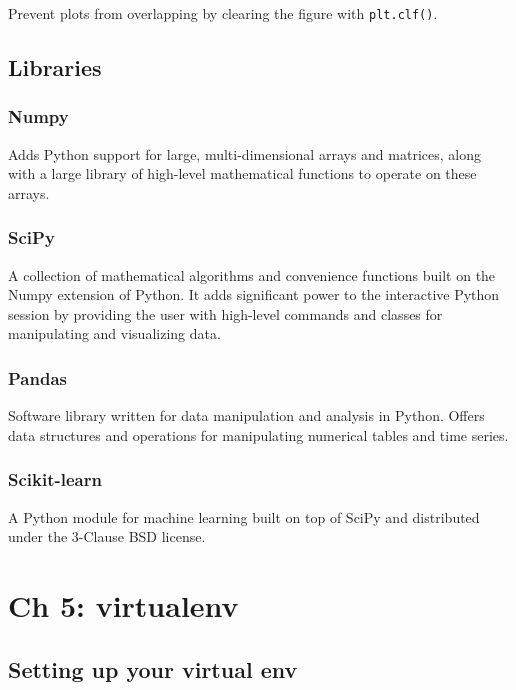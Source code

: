 \documentclass[]{book}
\theoremstyle{definition}
\theoremstyle{definition}
\theoremstyle{definition}
\theoremstyle{remark}
\begin{document}
Prevent plots from overlapping by clearing the figure with
\texttt{plt.clf()}.

\hypertarget{libraries-1}{%
\section{Libraries}\label{libraries-1}}

\hypertarget{numpy}{%
\subsection{Numpy}\label{numpy}}

Adds Python support for large, multi-dimensional arrays and matrices,
along with a large library of high-level mathematical functions to
operate on these arrays.

\hypertarget{scipy}{%
\subsection{SciPy}\label{scipy}}

A collection of mathematical algorithms and convenience functions built
on the Numpy extension of Python. It adds significant power to the
interactive Python session by providing the user with high-level
commands and classes for manipulating and visualizing data.

\hypertarget{pandas}{%
\subsection{Pandas}\label{pandas}}

Software library written for data manipulation and analysis in Python.
Offers data structures and operations for manipulating numerical tables
and time series.

\hypertarget{scikit-learn}{%
\subsection{Scikit-learn}\label{scikit-learn}}

A Python module for machine learning built on top of SciPy and
distributed under the 3-Clause BSD license.

\hypertarget{ch-5-virtualenv}{%
\chapter{Ch 5: virtualenv}\label{ch-5-virtualenv}}

\hypertarget{setting-up-your-virtual-env}{%
\section{Setting up your virtual
env}\label{setting-up-your-virtual-env}}
\end{document}
